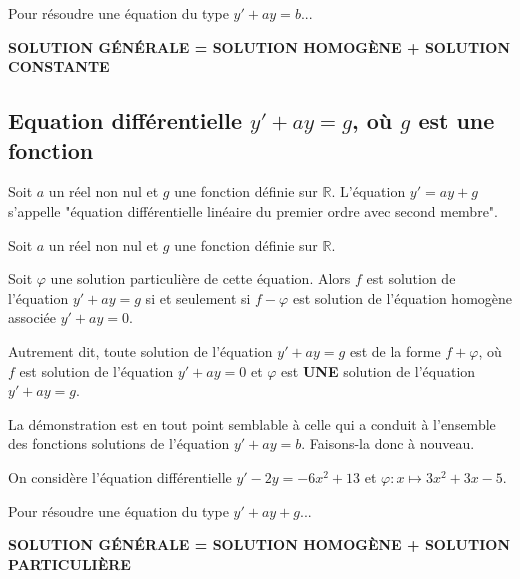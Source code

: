 \documentclass[11pt,fleqn, openany]{book} %
\begin{document}
\begin{proposition} Pour résoudre une équation du type $y'+ay=b$...
\begin{center}
\textbf{SOLUTION GÉNÉRALE = SOLUTION HOMOGÈNE + SOLUTION CONSTANTE}
\end{center}\vspace{-0.5cm}\end{proposition}


\subsection{Equation différentielle $y'+ay=g$, où $g$ est une fonction}

\begin{definition}Soit $a$ un réel non nul et $g$ une fonction définie sur $\mathbb{R}$. L'équation $y'=ay+g$ s'appelle "équation différentielle linéaire du premier ordre avec second membre".\end{definition}

\begin{proposition}Soit $a$ un réel non nul et $g$ une fonction définie sur $\mathbb{R}$. 

Soit $\varphi$ une solution particulière de cette équation. Alors $f$ est solution de l'équation $y'+ay=g$ si et seulement si $f-\varphi$ est solution de l'équation homogène associée $y'+ay=0$.

Autrement dit, toute solution de l'équation $y'+ay=g$ est de la forme $f+\varphi$, où $f$ est solution de l'équation $y'+ay=0$ et $\varphi$ est \textbf{UNE} solution de l'équation $y'+ay=g$.\end{proposition}


\begin{demonstration}La démonstration est en tout point semblable à celle qui a conduit à l'ensemble des fonctions solutions de l'équation $y'+ay=b$. Faisons-la donc à nouveau. 

\vskip170pt

\end{demonstration}

\begin{example} On considère l'équation différentielle $y'-2y=-6x^2+13$ et $\varphi :x \mapsto 3x^2+3x-5$.

\vskip170pt

\end{example}

\begin{proposition} Pour résoudre une équation du type $y'+ay+g$...
\begin{center}
\textbf{SOLUTION GÉNÉRALE = SOLUTION HOMOGÈNE + SOLUTION PARTICULIÈRE}
\end{center}\vspace{-0.5cm}\end{proposition}
\end{document}
